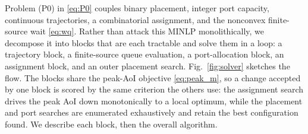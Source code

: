 
Problem (P0) in \eqref{eq:P0} couples binary placement, integer port capacity,
continuous trajectories, a combinatorial assignment, and the nonconvex
finite-source wait \eqref{eq:wq}. Rather than attack this MINLP monolithically,
we decompose it into blocks that are each tractable and solve them in a loop:
a trajectory block, a finite-source queue evaluation, a port-allocation block,
an assignment block, and an outer placement search. Fig.~\ref{fig:solver}
sketches the flow. The blocks share the peak-AoI objective \eqref{eq:peak_m},
so a change accepted by one block is scored by the same criterion the others
use: the assignment search drives the peak AoI down monotonically to a local
optimum, while the placement and port searches are enumerated exhaustively and
retain the best configuration found. We describe each block, then the overall
algorithm.

